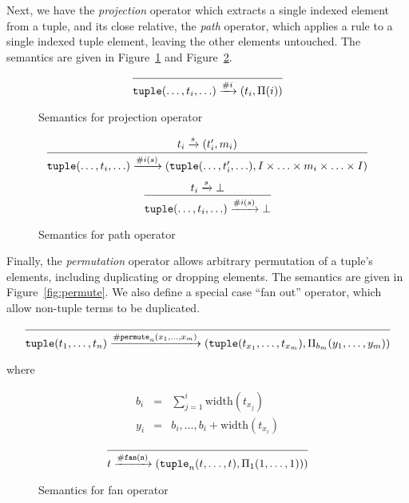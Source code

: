 Next, we have the \emph{projection} operator which extracts a single indexed element from a tuple, and its close relative, the \emph{path} operator, which applies a rule to a single indexed tuple element, leaving the other elements untouched. The semantics are given in Figure~\ref{fig:projection} and Figure~\ref{fig:path}.

\begin{figure}[ht]
\label{fig:projection}
\[
\infer
  {\mathtt{tuple}(\ldots,t_i,\ldots) \arr{\#i} (t_i,\Pi(i))}
  {}
\]
\caption{Semantics for projection operator}
\end{figure}

\begin{figure}[ht]
\label{fig:path}
\[
\infer
  {\mathtt{tuple}(\ldots,t_i,\ldots) \arr{\#i(s)} (\mathtt{tuple}(\ldots,t_i',\ldots), I \times \ldots \times m_i \times \ldots \times I)}
  {t_i \arr{s} (t_i',m_i)}
\]
\[
\infer
  {\mathtt{tuple}(\ldots,t_i,\ldots) \arr{\#i(s)} \bot}
  {t_i \arr{s} \bot}
\]
\caption{Semantics for path operator}
\end{figure}

Finally, the \emph{permutation} operator allows arbitrary permutation of a tuple's elements, including duplicating or dropping elements. The semantics are given in Figure~\ref{fig:permute}. We also define a special case ``fan out'' operator, which allow non-tuple terms to be duplicated.

\begin{figure*}[htb]
\label{fig:permute}
\[
\infer
  {\mathtt{tuple}(t_1,\ldots,t_n) \arr{\mathtt{\#permute}_n(x_1,\ldots,x_m)} (\mathtt{tuple}(t_{x_1},\ldots,t_{x_m}),\Pi_{b_m}(y_1,\ldots,y_m))}
  {}
\]

\begin{center}
where
\end{center}

\begin{eqnarray*}
b_i &=& \sum_{j=1}^{i} \mbox{width}(t_{x_j})\\
y_i &=& b_i,\ldots,b_i + \mbox{width}(t_{x_i})
\end{eqnarray*}

\caption{Semantics for permutation operator}
\end{figure*}


\begin{figure}[ht]
\label{fig:fan}
\[
\infer
  {t \arr{\mathtt{\#fan(n)}} (\mathtt{tuple}_n(t,\ldots,t),\Pi_1(1,\ldots,1)))}
  {}
\]
\caption{Semantics for fan operator}
\end{figure}


